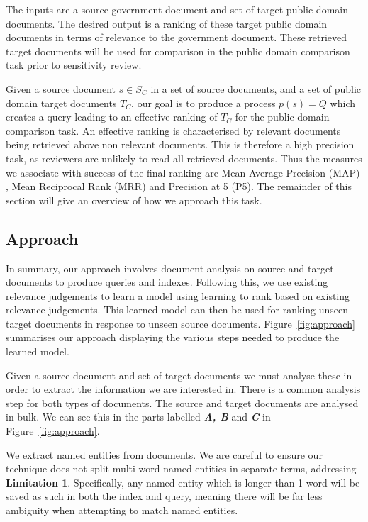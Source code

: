 \documentclass{mpaper}
\begin{document}
The inputs are a source government document and set of target public domain documents.
The desired output is a ranking of these target public domain documents in terms of relevance to the government document. 
These retrieved target documents will be used for comparison in the public domain comparison task prior to sensitivity review.

Given a source document $s \in S_C$ in a set of source documents, and a set of public domain target documents $T_C$, our goal is to produce a process $p(s) = Q$ which creates a query leading to an effective ranking of $T_C$ for the public domain comparison task.
An effective ranking is characterised by relevant documents being retrieved above non relevant documents. This is therefore a high precision task, as reviewers are unlikely to read all retrieved documents. Thus the measures we associate with success of the final ranking are Mean Average Precision (MAP) , Mean Reciprocal Rank (MRR) and Precision at 5 (P\@5).
The remainder of this section will give an overview of how we approach this task. 

\subsection{Approach} \label{sec:overview.approach}
In summary, our approach involves document analysis on source and target documents to produce queries and indexes. Following this, we use existing relevance judgements to learn a model using learning to rank based on existing relevance judgements. This learned model can then be used for ranking unseen target documents in response to unseen source documents.
Figure~\ref{fig:approach} summarises our approach displaying the various steps needed to produce the learned model.

Given a source document and set of target documents we must analyse these in order to extract the information we are interested in.
There is a common analysis step for both types of documents. The source and target documents are analysed in bulk. We can see this in the parts labelled \textbf{\textit{A, B}} and \textbf{\textit{C}} in Figure~\ref{fig:approach}.

We extract named entities from documents. We are careful to ensure our technique does not split multi-word named entities in separate terms, addressing \textbf{Limitation 1}. Specifically, any named entity which is longer than 1 word will be saved as such in both the index and query, meaning there will be far less ambiguity when attempting to match named entities.
\end{document}
